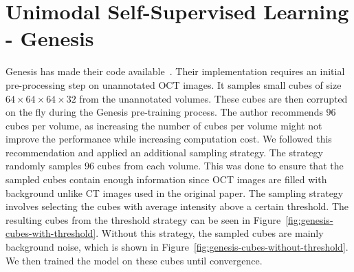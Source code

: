 \documentclass[a4paper,11pt,oneside]{report}
\begin{document}
\section{Unimodal Self-Supervised Learning - Genesis}
Genesis has made their code available~\cite{Zhou2021}. Their implementation requires an initial pre-processing step on unannotated OCT images. It samples small cubes of size $64\times 64\times 64\times 32$ from the unannotated volumes. These cubes are then corrupted on the fly during the Genesis pre-training process. The author recommends $96$ cubes per volume, as increasing the number of cubes per volume might not improve the performance while increasing computation cost. We followed this recommendation and applied an additional sampling strategy. The strategy randomly samples $96$ cubes from each volume. This was done to ensure that the sampled cubes contain enough information since OCT images are filled with background unlike CT images used in the original paper. The sampling strategy involves selecting the cubes with average intensity above a certain threshold. The resulting cubes from the threshold strategy can be seen in Figure~\ref{fig:genesis-cubes-with-threshold}. Without this strategy, the sampled cubes are mainly background noise, which is shown in Figure~\ref{fig:genesis-cubes-without-threshold}. We then trained the model on these cubes until convergence.
\end{document}
